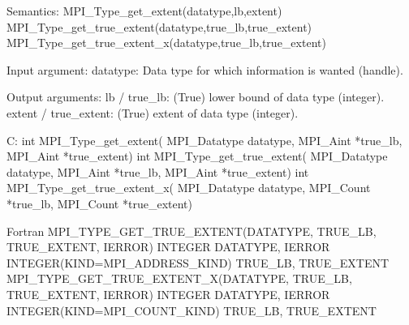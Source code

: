 Semantics:
MPI_Type_get_extent(datatype,lb,extent)
MPI_Type_get_true_extent(datatype,true_lb,true_extent)
MPI_Type_get_true_extent_x(datatype,true_lb,true_extent)

Input argument:
datatype: Data type for which information is wanted (handle).

Output arguments:
lb / true_lb: (True) lower bound of data type (integer).
extent / true_extent: (True) extent of data type (integer).

C:
int MPI_Type_get_extent(
    MPI_Datatype datatype,
    MPI_Aint *true_lb, MPI_Aint *true_extent)
int MPI_Type_get_true_extent(
    MPI_Datatype datatype,
    MPI_Aint *true_lb, MPI_Aint *true_extent)
int MPI_Type_get_true_extent_x(
    MPI_Datatype datatype,
    MPI_Count *true_lb, MPI_Count *true_extent)

Fortran
MPI_TYPE_GET_TRUE_EXTENT(DATATYPE, TRUE_LB, TRUE_EXTENT, IERROR)
    INTEGER    DATATYPE, IERROR
    INTEGER(KIND=MPI_ADDRESS_KIND) TRUE_LB, TRUE_EXTENT
MPI_TYPE_GET_TRUE_EXTENT_X(DATATYPE, TRUE_LB, TRUE_EXTENT, IERROR)
    INTEGER    DATATYPE, IERROR
    INTEGER(KIND=MPI_COUNT_KIND) TRUE_LB, TRUE_EXTENT


